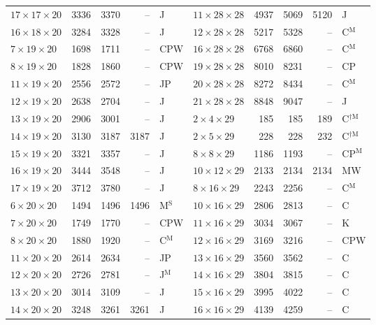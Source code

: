 \begin{longtable}{@{}lrrrl@{\hspace{6mm}}lrrrl@{}}
$17{\times}17{\times}20$ & 3336 & 3370 & -- & J & $11{\times}28{\times}28$ & 4937 & 5069 & 5120 & J\\
$16{\times}18{\times}20$ & 3284 & 3328 & -- & J & $12{\times}28{\times}28$ & 5217 & 5328 & -- & C$^{\mathrm{M}}$\\
$7{\times}19{\times}20$ & 1698 & 1711 & -- & CPW & $16{\times}28{\times}28$ & 6768 & 6860 & -- & C$^{\mathrm{M}}$\\
$8{\times}19{\times}20$ & 1828 & 1860 & -- & CPW & $19{\times}28{\times}28$ & 8010 & 8231 & -- & CP\\
$11{\times}19{\times}20$ & 2556 & 2572 & -- & JP & $20{\times}28{\times}28$ & 8272 & 8434 & -- & C$^{\mathrm{M}}$\\
$12{\times}19{\times}20$ & 2638 & 2704 & -- & J & $21{\times}28{\times}28$ & 8848 & 9047 & -- & J\\
$13{\times}19{\times}20$ & 2906 & 3001 & -- & J & $2{\times}4{\times}29$ & 185 & 185 & 189 & C$^{\dagger\mathrm{M}}$\\
$14{\times}19{\times}20$ & 3130 & 3187 & 3187 & J & $2{\times}5{\times}29$ & 228 & 228 & 232 & C$^{\dagger\mathrm{M}}$\\
$15{\times}19{\times}20$ & 3321 & 3357 & -- & J & $8{\times}8{\times}29$ & 1186 & 1193 & -- & CP$^{\mathrm{M}}$\\
$16{\times}19{\times}20$ & 3444 & 3548 & -- & J & $10{\times}12{\times}29$ & 2133 & 2134 & 2134 & MW\\
$17{\times}19{\times}20$ & 3712 & 3780 & -- & J & $8{\times}16{\times}29$ & 2243 & 2256 & -- & C$^{\mathrm{M}}$\\
$6{\times}20{\times}20$ & 1494 & 1496 & 1496 & M$^{\mathrm{S}}$ & $10{\times}16{\times}29$ & 2806 & 2813 & -- & C\\
$7{\times}20{\times}20$ & 1749 & 1770 & -- & CPW & $11{\times}16{\times}29$ & 3034 & 3067 & -- & K\\
$8{\times}20{\times}20$ & 1880 & 1920 & -- & C$^{\mathrm{M}}$ & $12{\times}16{\times}29$ & 3169 & 3216 & -- & CPW\\
$11{\times}20{\times}20$ & 2614 & 2634 & -- & JP & $13{\times}16{\times}29$ & 3560 & 3562 & -- & C\\
$12{\times}20{\times}20$ & 2726 & 2781 & -- & J$^{\mathrm{M}}$ & $14{\times}16{\times}29$ & 3804 & 3815 & -- & C\\
$13{\times}20{\times}20$ & 3014 & 3109 & -- & J & $15{\times}16{\times}29$ & 3995 & 4022 & -- & C\\
$14{\times}20{\times}20$ & 3248 & 3261 & 3261 & J & $16{\times}16{\times}29$ & 4139 & 4259 & -- & C\\

\end{longtable}
